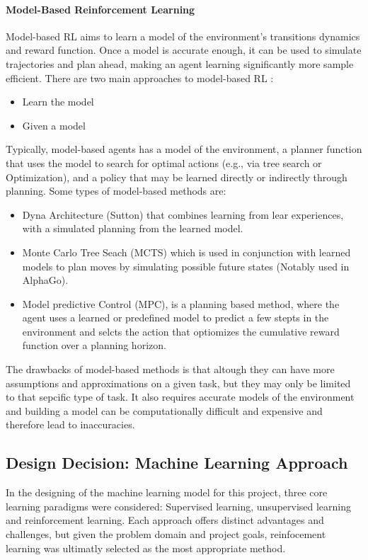 \paragraph{Model-Based Reinforcement Learning}
Model-based RL aims to learn a model of the environment's transitions dynamics
and reward function. Once a model is accurate enough, it can be used to 
simulate trajectories and plan ahead, making an agent learning significantly more
sample efficient. There are two main approaches to model-based RL \cite{ReinforcementLearning}:
\begin{itemize}
      \item Learn the model 
      \item Given a model
\end{itemize}
Typically, model-based agents has a model of the environment, a planner function that uses
the model to search for optimal actions (e.g., via tree search or Optimization), and a policy
that may be learned directly or indirectly through planning.
Some types of model-based methods are:
\begin{itemize}
      \item Dyna Architecture (Sutton) that combines learning from lear experiences, 
      with a simulated planning from the learned model.
      \item Monte Carlo Tree Seach (MCTS) which is used in conjunction with learned models
      to plan moves by simulating possible future states (Notably used in AlphaGo). \cite{ReinforcementLearning}
      \item Model predictive Control (MPC), is a planning based method, where the agent
      uses a learned or predefined model to predict a few stepts in the environment and 
      selcts the action that optiomizes the cumulative reward function over a planning horizon. \cite{Types-of-Reinforcement-Learning} 
\end{itemize}
The drawbacks of model-based methods is that altough they can have more assumptions
and approximations on a given task, but they may only be limited to that sepcific 
type of task. It also requires accurate models of the environment and building a model
can be computationally difficult and expensive and therefore lead to inaccuracies. \cite{Types-of-Reinforcement-Learning}

\subsection{Design Decision: Machine Learning Approach}
\label{sec:ML-Design-Decision}
In the designing of the machine learning model for this project, three core learning paradigms
were considered: Supervised learning, unsupervised learning and reinforcement learning. Each 
approach offers distinct advantages and challenges, but given the problem domain and 
project goals, reinfocement learning was ultimatly selected as the most appropriate method.

